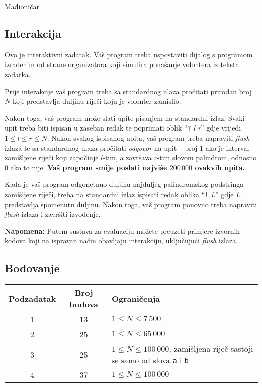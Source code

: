 \begin{statement}[
  problempoints=100,
  timelimit=5 sekundi,
  memorylimit=512 MiB,
]{Mađioničar}
\subsection*{Interakcija}
Ovo je interaktivni zadatak. Vaš program treba uspostaviti dijalog s programom
izrađenim od strane organizatora koji simulira ponašanje volontera iz teksta
zadatka.

Prije interakcije vaš program treba sa standardnog ulaza pročitati
prirodan broj $N$ koji predstavlja duljinu riječi koju je volonter
zamislio.

Nakon toga, vaš program može slati upite pisanjem na standardni izlaz. Svaki
upit treba biti ispisan u zaseban redak te poprimati oblik
``\texttt{?} \textit{l r}''
gdje vrijedi $1 \le l \le r \le N$. Nakon svakog ispisanog upita, vaš program
treba napraviti \textit{flush} izlaza te sa standardnog ulaza pročitati
\textit{odgovor} na upit -- broj $1$ ako je interval zamišljene riječi koji
započinje $l$-tim, a završava $r$-tim slovom palindrom, odnosno $0$ ako to
nije. \textbf{Vaš program smije poslati najviše $200\,000$ ovakvih upita.}

Kada je vaš program odgonetnuo duljinu najduljeg palindromskog podstringa
zamišljene riječi, treba na standardni izlaz ispisati redak oblika
``\texttt{!} \textit{L}'' gdje $L$ predstavlja spomenutu duljinu. Nakon toga,
vaš program ponovno treba napraviti \textit{flush} izlaza i završiti
izvođenje.

\textbf{Napomena:} Putem sustava za evaluaciju možete preuzeti primjere
izvornih kodova koji na ispravan način obavljaju interakciju, uključujući
\textit{flush} izlaza.

\subsection*{Bodovanje}

{\renewcommand{\arraystretch}{1.4}
  \setlength{\tabcolsep}{6pt}
  \begin{tabular}{ccl}
   Podzadatak & Broj bodova & Ograničenja \\ \midrule
    1 & 13 & $1 \leq N \leq 7\,500$ \\
    2 & 25 & $1 \leq N \leq 65\,000$ \\
    3 & 25 & $1 \leq N \leq 100\,000$, zamišljena riječ sastoji se samo od slova \texttt{a} i \texttt{b} \\
    4 & 37 & $1 \leq N \leq 100\,000$ \\
\end{tabular}}


\end{statement}
